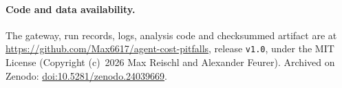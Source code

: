 \documentclass[10pt]{article}
\begin{document}
\begin{appendices}
\paragraph{Code and data availability.}
The gateway, run records, logs, analysis code and checksummed artifact are at
\url{https://github.com/Max6617/agent-cost-pitfalls}, release \texttt{v1.0},
under the MIT License
(Copyright (c)~2026 Max Reischl and Alexander Feurer).
Archived on Zenodo: \href{https://doi.org/10.5281/zenodo.24039669}{doi:10.5281/zenodo.24039669}.

\end{appendices}
\end{document}

